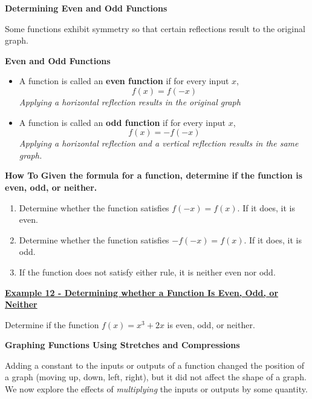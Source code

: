\documentclass[12pt]{book}
\begin{document}
\newpage
{\large \textbf{Determining Even and Odd Functions}}

Some functions exhibit symmetry so that certain reflections result to the original graph.

\begin{boxR}
    \textbf{Even and Odd Functions}
    \vspace{1mm}
    \hline
    \vspace{2mm}
    \begin{itemize}
        \item  A function is called an \textbf{even function} if for every input $x$, 
    $$f(x)=f(-x)$$
    \textit{Applying a horizontal reflection results in the original graph}
    \item  A function is called an \textbf{odd function} if for every input $x$, 
    $$f(x)=-f(-x)$$
    \textit{Applying a horizontal reflection and a vertical reflection results in the same graph.}
    \end{itemize}
    
\end{boxR}

 \begin{boxR}
       \textbf{How To}
       \vspace{1mm}
       \hline 
       \vspace{2mm}
       \textbf{Given the formula for a function, determine if the function is even, odd, or neither.}
       \begin{enumerate}
           \item Determine whether the function satisfies $f(-x) = f(x)$.  If it does, it is even.
           \item Determine whether the function satisfies $-f(-x) = f(x)$.   If it does, it is odd.
           \item If the function does not satisfy either rule, it is neither even nor odd.
       \end{enumerate}
   \end{boxR}


\underline{\textbf{Example 12 - Determining whether a Function Is Even, Odd, or Neither}}

Determine if the function $f(x) = x^3 +2x$ is even, odd, or neither. 



\newpage
\textbf{{\large Graphing Functions Using Stretches and Compressions}}

Adding a constant to the inputs or outputs of a function changed the position of a graph (moving up, down, left, right), but it did not affect the shape of a graph. We now explore the effects of \textit{multiplying} the inputs or outputs by some quantity.
\\
\end{document}

